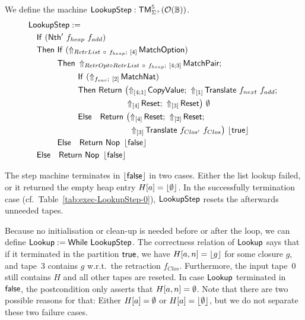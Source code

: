 \begin{definition}
  \label{def:Lookup_Step}
  We define the machine $\mathsf{LookupStep} : \mathsf{TM}_{\Sigma^+}^5(\mathcal{O}(\mathbb{B}))$.
  \begin{align*}
    & \MS{LookupStep} := \\
    & \quad \MS{If}~(\MS{Nth'}~f_{heap}~f_{add}) \\
    & \quad \MS{Then}~\MS{If}~(\LiftBoth{\MS{MatchOption}}{RetrList ~\circ~ f_{heap}}{\Vector{4}}) \\
    & \quad \phantom{\MS{Then}}~\MS{Then}~\LiftBoth{\MS{MatchPair}}{RetrOpt \circ RetrList ~\circ~ f_{heap}}{\Vector{4;3}} \Seq \\
    & \quad \phantom{\MS{Then}~\MS{Then}}~\MS{If}~(\LiftBoth{\MS{MatchNat}}{f_{var}}{\Vector{2}}) \\
    & \quad \phantom{\MS{Then}~\MS{Then}}~\MS{Then}~ \MS{Return}~\bigl(
      \LiftTapes{\MS{CopyValue}}{\Vector{4;1}} \Seq
      \LiftTapes{\MS{Translate}~f_{next}~f_{add}}{\Vector{1}} \Seq \\
    & \quad \phantom{\MS{Then}~\MS{Then}~\MS{Then}~\MS{Return}\bigl(}
      \LiftTapes{\MS{Reset}}{\Vector{4}} \Seq
      \LiftTapes{\MS{Reset}}{\Vector{3}}
      \bigr)~{\None} \\
    & \quad \phantom{\MS{Then}~\MS{Then}}~\MS{Else}~~~ \MS{Return}~\bigl(
      \LiftTapes{\MS{Reset}}{\Vector{4}} \Seq
      \LiftTapes{\MS{Reset}}{\Vector{2}} \Seq \\
    & \quad \phantom{\phantom{\MS{Then}~\MS{Then}}~\MS{Else}~~~\MS{Return}~\bigl(}
      \LiftTapes{\MS{Translate}~f_{Clos'}~f_{Clos}}{\Vector{3}}
      \bigr)~{\Some\true} \\
    & \quad \phantom{\MS{Then}}~\MS{Else}~~~ \Return{\Nop}{\Some\false} \\
    & \quad \MS{Else}~~~ \Return{\Nop}{\Some\false}
  \end{align*}
\end{definition}

The step machine terminates in $\left\lfloor {\ensuremath{\mathsf{false}}} \right\rfloor$ in two cases.  Either the list lookup failed, or it returned the empty heap entry $H[a]=\left\lfloor {\emptyset} \right\rfloor$.  In
the successfully termination case (cf.\ Table~\ref{tab:exec-LookupStep-0}), $\mathsf{LookupStep}$ resets the afterwards unneeded tapes.

Because no initialisation or clean-up is needed before or after the loop, we can define $\mathsf{Lookup} := \mathsf{While}~\mathsf{LookupStep}$.  The correctness
relation of $\mathsf{Lookup}$ says that if it terminated in the partition $\mathsf{true}$, we have $H[a,n] = \left\lfloor {g} \right\rfloor$ for some closure $g$, and tape~$3$ contains
$g$ w.r.t.\ the retraction $f_{Clos}$.  Furthermore, the input tape~$0$ still contains $H$ and all other tapes are reseted.  In case $\mathsf{Lookup}$
terminated in $\mathsf{false}$, the postcondition only asserts that $H[a,n]=\emptyset$.  Note that there are two possible reasons for that: Either $H[a]=\emptyset$ or
$H[a]=\left\lfloor {\emptyset} \right\rfloor$, but we do not separate these two failure cases.

